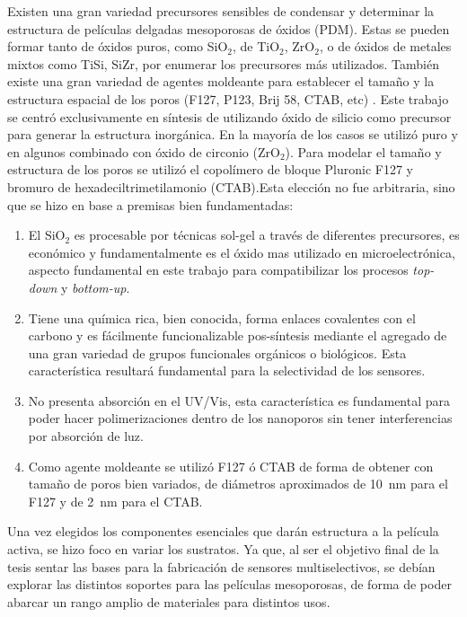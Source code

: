 	Existen una gran variedad precursores sensibles de condensar y determinar la estructura de películas delgadas mesoporosas de óxidos (PDM). Estas se pueden formar tanto de óxidos puros, como SiO$_2$, de TiO$_2$, ZrO$_2$, o de óxidos de metales mixtos como TiSi, SiZr, por enumerar los precursores más utilizados. También existe una gran variedad de agentes moldeante para establecer el tamaño y la estructura espacial de los poros (F127, P123, Brij 58, CTAB, etc) \cite{angelome2011,schuth2013,Soler-Illia2006,Soler-Illia2002a}. Este trabajo se centró exclusivamente en síntesis de \pdm\space utilizando óxido de silicio como precursor para generar la estructura inorgánica. En la mayoría de los casos se utilizó puro y en algunos combinado con óxido de circonio (ZrO$_2$). Para modelar el tamaño y estructura de los poros se utilizó el copolímero de bloque Pluronic F127 y bromuro de hexadeciltrimetilamonio (CTAB).Esta elección no fue arbitraria, sino que se hizo en base a premisas bien fundamentadas:
		
		\begin{enumerate}

		\item El SiO$_2$ es procesable por técnicas sol-gel a través de diferentes precursores, es económico y fundamentalmente es el óxido mas utilizado en microelectrónica, aspecto fundamental en este trabajo para compatibilizar los procesos \textit{top-down} y \textit{bottom-up}.

		\item Tiene una química rica, bien conocida, forma enlaces covalentes con el carbono y es fácilmente funcionalizable pos-síntesis mediante el agregado de una gran variedad de grupos funcionales orgánicos o biológicos. Esta característica resultará fundamental para la selectividad de los sensores.

		\item No presenta absorción en el UV/Vis, esta característica es fundamental para poder hacer polimerizaciones dentro de los nanoporos sin tener interferencias por absorción de luz.

		\item Como agente moldeante se utilizó F127 ó CTAB de forma de obtener \pdm\space con tamaño de poros bien variados, de diámetros aproximados de \SI{10}{\nm} para el F127 y de \SI{2}{\nm} para el CTAB.

		\end{enumerate}
	
	Una vez elegidos los componentes esenciales que darán estructura a la película activa, se hizo foco en variar los sustratos. Ya que, al ser el objetivo final de la tesis sentar las bases para la fabricación de sensores multiselectivos, se debían explorar las distintos soportes para las películas mesoporosas, de forma de poder abarcar un rango amplio de materiales para distintos usos.

